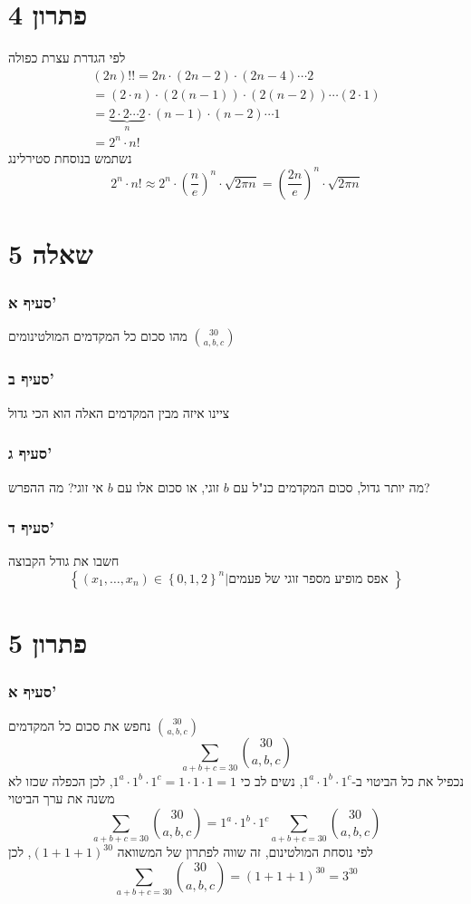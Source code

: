 \documentclass[12pt, titlepage]{article}
\begin{document}
\part*{פתרון 4}
לפי הגדרת עצרת כפולה
\begin{gather*}
  \left(2n\right)!! =2n\cdot \left(2n-2\right) \cdot \left(2n-4\right) \cdots 2 \\
= \left(2\cdot n\right) \cdot \left(2\left(n-1\right)\right) \cdot \left(2\left(n-2\right)\right) \cdots \left(2 \cdot 1\right)\\
=  \underbrace{2\cdot 2 \cdots 2}_{n} \cdot \left(n-1\right)\cdot\left(n-2\right)\cdots1 \\
= 2^n \cdot n!
\end{gather*}
נשתמש בנוסחת סטירלינג
\[
    2^n \cdot n! \approx 2^n \cdot \left(\frac{n}{e}\right)^n \cdot \sqrt{2\pi n} =\boxed{\left(\frac{2n}{e}\right)^n \cdot \sqrt{2 \pi n}}
\]
\newpage
\part*{שאלה 5}
\section*{סעיף א'}
מהו סכום כל המקדמים המולטינומים $\binom{30}{a,b,c}$
\section*{סעיף ב'}
ציינו איזה מבין המקדמים האלה הוא הכי גדול
\section*{סעיף ג'}
מה יותר גדול, סכום המקדמים כנ"ל עם $b$ זוגי, או סכום אלו עם $b$ אי זוגי? מה ההפרש?
\section*{סעיף ד'}
חשבו את גודל הקבוצה
\[
    \left\{\left(x_1,\ldots,x_n\right)\in\left\{0,1,2\right\}^{n}|\text{אפס מופיע מספר זוגי של פעמים }\right\}
\]
\part*{פתרון 5}
\section*{סעיף א'}
נחפש את סכום כל המקדמים $\binom{30}{a,b,c}$
\[
    \sum_{a+b+c=30} \binom{30}{a,b,c} 
\]
נכפיל את כל הביטוי ב-$1^a\cdot1^b\cdot1^c$, נשים לב כי $1^a\cdot1^b\cdot1^c=1\cdot1\cdot1=1$, לכן הכפלה שכזו לא משנה את ערך הביטוי
\[
    \sum_{a+b+c=30} \binom{30}{a,b,c}=   1^a \cdot 1^b \cdot 1^c
    \sum_{a+b+c=30} \binom{30}{a,b,c} 
\]
לפי נוסחת המולטינום, זה שווה לפתרון של המשוואה $\left(1+1+1\right)^{30}$, לכן
\[
\sum_{a+b+c=30} \binom{30}{a,b,c}  = \left(1+1+1\right)^{30} = \boxed{3^{30}}
\]
\end{document}
